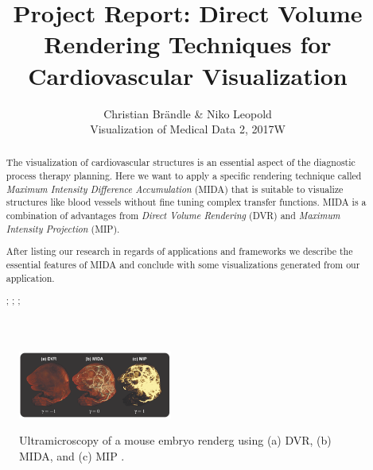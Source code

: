 \documentclass{egpubl}
\title{Project Report: Direct Volume Rendering Techniques for Cardiovascular Visualization}
\author{Christian Br{\"a}ndle \& Niko Leopold \\ Visualization of Medical Data 2, 2017W}
\begin{document}
\graphicspath{{images/}}

\maketitle


\begin{abstract}
	The visualization of cardiovascular structures is an essential aspect of the diagnostic process therapy planning.
	Here we want to apply a specific rendering technique called \emph{Maximum Intensity Difference Accumulation} (MIDA) \cite{bruckner2009instant} that is suitable to visualize structures like blood vessels without fine tuning complex transfer functions. MIDA is a combination of advantages from \emph{Direct Volume Rendering} (DVR) and \emph{Maximum Intensity Projection} (MIP).
	
	After listing our research in regards of applications and frameworks we describe the essential features of MIDA and conclude with some visualizations generated from our application. 
		
	\begin{classification} %
		;
		;
		;
	\end{classification}
	
\end{abstract}


\begin{figure}[h]
	\centering
	\includegraphics[width=0.45\textwidth]{MIDA_MouseEmbryo_II.png} \\
	\caption{ Ultramicroscopy of a mouse embryo renderg using (a) DVR, (b) MIDA, and (c) MIP \cite{bruckner2009instant}.}
	\label{fig:MIDA_MouseEmbryo_II}
\end{figure}
\end{document}

